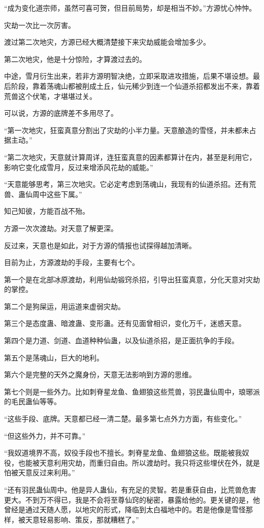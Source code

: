 \begin{this_body}
“成为变化道宗师，虽然可喜可贺，但目前局势，却是相当不妙。”方源忧心忡忡。

灾劫一次比一次厉害。

渡过第二次地灾，方源已经大概清楚接下来灾劫威能会增加多少。

第二次地灾，他是十分惊险，才算渡过去的。

中途，雪月衍生出来，若非方源明智决绝，立即采取进攻措施，后果不堪设想。最后阶段，靠着荡魂山都被削成土丘，仙元稀少到连一个仙道杀招都发出不来，靠着荒兽这个伏笔，才堪堪过关。

可以说，方源的底牌差不多用尽了。

“第一次地灾，狂蛮真意分割出了灾劫的小半力量。天意酿造的雪怪，并未都未占据主动。”

“第二次地灾，天意就计算周详，连狂蛮真意的因素都算计在内，甚至是利用它，影响它变化成雪月，反过来增添风花劫的威能。”

“天意能够思考，第三次地灾。它必定考虑到荡魂山，我现有的仙道杀招。还有荒兽、蛊仙周中这些下属。”

知己知彼，方能百战不殆。

方源一次次渡劫。对天意了解更深。

反过来，天意也是如此，对于方源的情报也试探得越加清晰。

目前为止，方源渡劫的手段，主要有七个。

第一个是在北部冰原渡劫，利用仙劫锻窍杀招，引导出狂蛮真意，分化天意对灾劫的掌控。

第二个是狗屎运，用运道来虚弱灾劫。

第三个是态度蛊、暗渡蛊、变形蛊。还有见面曾相识，变化万千，迷惑天意。

第四个是力道、剑道、血道种种仙蛊，以及仙道杀招，是正面抗争的手段。

第五个是荡魂山，巨大的地利。

第六个是完整的天外之魔身份，天意无法影响到方源的思维。

第七个则是一些外力。比如刺脊星龙鱼、鱼翅狼这些荒兽，羽民蛊仙周中，琅琊派的毛民蛊仙等等。

“这些手段、底牌。天意都已经一清二楚。最多第七点外力方面，有些变化。”

“但这些外力，并不可靠。”

“我奴道境界不高，奴役手段也不擅长。刺脊星龙鱼、鱼翅狼这些。既能被我奴役，也能被天意利用灾劫，而重归自由。所以渡劫时。我只将这些埋伏在外，就是怕被天意反过来利用。”

“还有羽民蛊仙周中。他是异人蛊仙，有充足的灵智。若是重获自由，比荒兽危害更大。不到万不得已，我是不会将至尊仙窍的秘密，暴露给他的。更关键的是，他曾经是通过天随人愿，以地灾的形式，降临到太白福地中的。若是他像是雪怪那样，被天意轻易影响、策反，那就糟糕了。”


\end{this_body}
